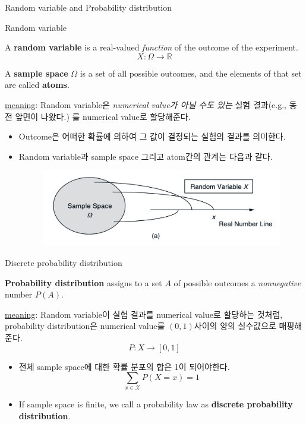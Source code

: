 \documentclass[9pt]{beamer}
\begin{document}
    \begin{section}{Random variable and Probability distribution}
      \begin{frame}{Random variable}
        \begin{definition}
          A \textbf{random variable} is a real-valued \textit{function} of the outcome of the experiment.
          $$X: \Omega \rightarrow \mathbb R$$
        \end{definition}
        \begin{definition}
            A \textbf{sample space} $\Omega$ is a set of all possible outcomes, and the elements of that set are called \textbf{atoms}.
        \end{definition}
        \checkmark \underline{meaning}: Random variable은 \textit{numerical value가 아닐 수도 있는} 실험 결과(e.g., 동전 앞면이 나왔다.) 를 numerical value로 할당해준다. 
        \begin{itemize}
          \item Outcome은 어떠한 \alert{확률}에 의하여 그 값이 결정되는 실험의 결과를 의미한다.  
          \item Random variable과 sample space 그리고 atom간의 관계는 다음과 같다.
          
          \vspace{0.3cm}

          \begin{figure}
            \includegraphics[width=0.5\columnwidth]{image/L1-sample_space.png}
            \end{figure}
        \end{itemize}
      \end{frame}

      \begin{frame}{Discrete probability distribution}
        \begin{definition}
          \textbf{Probability distribution} assigns to a set $A$ of possible outcomes a \textit{nonnegative} number $P(A)$. 
        \end{definition}
        \checkmark \underline{meaning}: Random variable이 실험 결과를 numerical value로 할당하는 것처럼, probability distribution은 numerical value를 $(0, 1)$사이의 양의 실수값으로 매핑해준다.
        $$P: X \rightarrow [0,1]$$
        \begin{itemize}
          \item 전체 sample space에 대한 확률 분포의 합은 1이 되어야한다. 
          $$\sum_{x \in \mathcal X} P(X=x) = 1$$
          \item If sample space is finite, we call a probability law as \textbf{discrete probability distribution}.
        \end{itemize}
      \end{frame}


\end{section}
\end{document}
